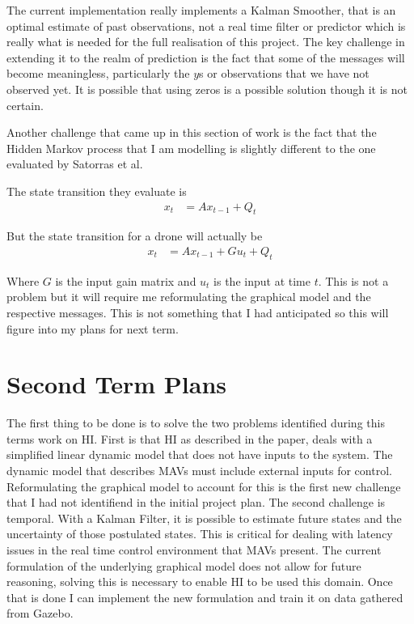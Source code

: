 \documentclass[]{../resources/final_report}
\begin{document}
The current implementation really implements a Kalman Smoother, that is an optimal estimate of past 
observations, not a real time filter or predictor which is really what is needed for the full 
realisation of this project. The key challenge in extending it to the realm of prediction is the fact 
that some of the messages will become meaningless, particularly the $y$s or observations that we 
have not observed yet. It is possible that using zeros is a possible solution though it is not 
certain.

Another challenge that came up in this section of work is the fact that the Hidden Markov process 
that I am modelling is slightly different to the one evaluated by Satorras et al.

The state transition they evaluate is 
\begin{align}
  x_t &= Ax_{t-1} + Q_t
\end{align}

But the state transition for a drone will actually be
\begin{align}
  x_t &= Ax_{t-1} + Gu_t + Q_t
\end{align} 

Where $G$ is the input gain matrix and $u_t$ is the input at time $t$.
This is not a problem but it will require me reformulating the graphical model and the respective 
messages. This is not something that I had anticipated so this will figure into my plans for next 
term.

\chapter{Second Term Plans}

The first thing to be done is to solve the two problems identified during this terms work on HI.
First is that HI as described 
in the paper, deals with a simplified linear dynamic model that does not have inputs to the system.
The dynamic model that describes MAVs must include external inputs for control. Reformulating the 
graphical model to account for this is the first new challenge that I had not identifiend in the 
initial project plan. The second challenge is temporal. With a Kalman Filter, it is possible to 
estimate future states and the uncertainty of those postulated states. This is critical for dealing 
with latency issues in the real time control environment that MAVs present. The current formulation 
of the underlying graphical model does not allow for future reasoning, solving this is necessary to
enable HI to be used this domain. Once that is done I can implement the new formulation and train it on data gathered from Gazebo.
\end{document}
